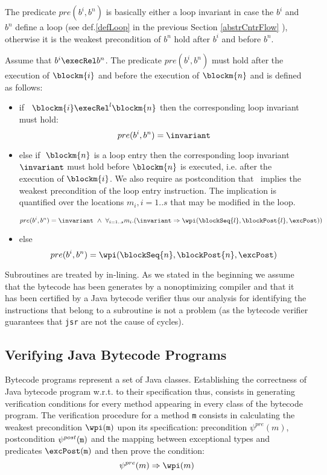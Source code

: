 \begin{defn}
\end{defn}

The predicate $pre(b^{i}, b^{n})$ is basically either a loop invariant in case the $b^{i}$ and $b^{n}$ define a loop (see def.\ref{defLoop} in the previous Section \ref{abstrCntrFlow} ), otherwise it is the weakest precondition of $b^{n}$ hold after $b^{i}$ and before $b^{n}$. 
\begin{defn}\label{post2}
Assume that $b^i \execRel b^n$. The predicate $pre(b^{i}, b^{n})$ must hold after the execution of $\blockm{i}$ and before the execution of $\blockm{n}$ and is defined as follows:
\begin{itemize}
\item if \ $\blockm{i} \execRel^l \blockm{n}$ 
then the corresponding loop invariant must hold:
$$
pre(b^{i}, b^{n}) =  \invariant
$$

\item else if $\ \blockm{n}$ is a loop entry then the corresponding loop invariant $\invariant$ must hold before $\blockm{n}$ is executed, i.e. after the execution of $\blockm{i}$. We also require as postcondition that \invariant \ implies the weakest precondition of the loop entry instruction. The implication is quantified over the locations $m_i , i= 1..s$ that may be modified in the loop.

$$
pre(b^{i}, b^{n}) = \invariant \ \wedge \ \forall_{i = 1..s} m_i.(
\invariant \Rightarrow \wpi(\blockSeq{l},\blockPost{l},\excPost))
$$
\item else 
$$
pre(b^{i}, b^{n}) = \wpi( \blockSeq{n} ,  \blockPost{n}, \excPost)
$$
\end{itemize}
\end{defn}
Subroutines are treated by in-lining. As we stated in the beginning we assume that the  bytecode has been generates by a nonoptimizing compiler and that it 
has been certified by a Java bytecode verifier thus our analysis for identifying the instructions that belong to a subroutine is not a problem (as the bytecode verifier guarantees that \texttt{jsr} are not the cause of cycles).  


\subsection{Verifying Java Bytecode Programs} Bytecode programs represent a set of Java classes. Establishing the correctness of Java bytecode program w.r.t. to their specification thus, consists in generating verification conditions for every method appearing in every class of the bytecode program.
The verification procedure for a method \texttt{m} consists in  calculating the weakest precondition $\wpi(\tt{m})$ upon its specification: precondition $\psi^{pre}(m)$, 
postcondition $\psi^{post}(\tt{m})$ and the mapping between exceptional types and predicates $\excPost(\tt{m})$ and then prove the condition: 
$$
\psi^{pre}(m)  \Rightarrow \wpi(m)
$$    


